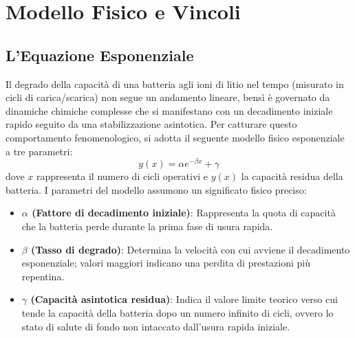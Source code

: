 \documentclass[11pt, a4paper]{article}
\begin{document}
\section{Modello Fisico e Vincoli}
\subsection{L'Equazione Esponenziale}
Il degrado della capacità di una batteria agli ioni di litio nel tempo (misurato in cicli di carica/scarica) non segue un andamento lineare, bensì è governato da dinamiche chimiche complesse che si manifestano con un decadimento iniziale rapido seguito da una stabilizzazione asintotica. Per catturare questo comportamento fenomenologico, si adotta il seguente modello fisico esponenziale a tre parametri:
\begin{equation}
    y(x) = \alpha e^{-\beta x} + \gamma
\end{equation}
dove $x$ rappresenta il numero di cicli operativi e $y(x)$ la capacità residua della batteria. I parametri del modello assumono un significato fisico preciso:
\begin{itemize}
    \item \textbf{$\alpha$ (Fattore di decadimento iniziale)}: Rappresenta la quota di capacità che la batteria perde durante la prima fase di usura rapida.
    \item \textbf{$\beta$ (Tasso di degrado)}: Determina la velocità con cui avviene il decadimento esponenziale; valori maggiori indicano una perdita di prestazioni più repentina.
    \item \textbf{$\gamma$ (Capacità asintotica residua)}: Indica il valore limite teorico verso cui tende la capacità della batteria dopo un numero infinito di cicli, ovvero lo stato di salute di fondo non intaccato dall'usura rapida iniziale.
\end{itemize}
\end{document}
